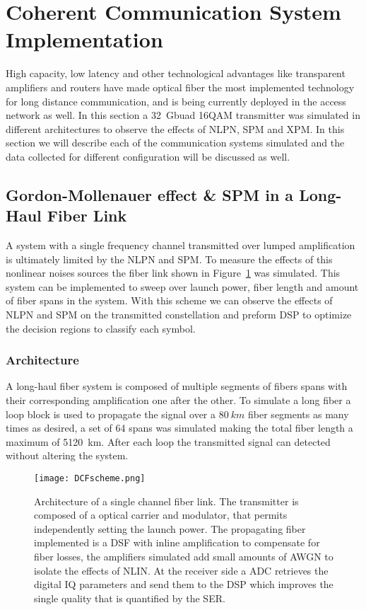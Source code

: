 \section{Coherent Communication System Implementation}

High capacity, low latency and other technological advantages like transparent amplifiers and routers have made optical fiber the most implemented technology for long distance communication, and is being currently deployed in the access network as well. In this section a 32~Gbuad 16QAM transmitter was simulated in different architectures to observe the effects of NLPN, SPM and XPM. In this section we will describe each of the communication systems simulated and the data collected for different configuration will be discussed as well. 


\subsection{Gordon-Mollenauer effect \& SPM in a Long-Haul Fiber Link }
A system with a single frequency channel transmitted over lumped amplification is ultimately limited by the NLPN and SPM. To measure the effects of this nonlinear noises sources the fiber link shown in Figure~\ref{fig:1chlink} was simulated. This system can be implemented to sweep over launch power, fiber length and amount of fiber spans in the system. With this scheme we can observe the effects of NLPN and SPM on the transmitted constellation and preform DSP to optimize the decision regions to classify each symbol.


\subsubsection{Architecture}
A long-haul fiber system is composed of multiple segments of fibers spans with their corresponding amplification one after the other. To simulate a long fiber a loop block is used to propagate the signal over a  $80~km$ fiber segments as many times as desired, a set of 64 spans was simulated making the total fiber length a maximum of 5120~km. After each loop the transmitted signal can detected without altering the system. 
 

\begin{figure}[h]
\centering
\texttt{[image: DCFscheme.png]}
\caption{Architecture of a single channel fiber link. The transmitter is composed of a optical carrier and modulator, that permits independently setting the launch power. The propagating fiber implemented is a DSF with inline amplification to compensate for fiber losses, the amplifiers simulated add small amounts of AWGN to isolate the effects of NLIN. At the receiver side a ADC retrieves the digital IQ parameters and send them to the DSP which improves the single quality that is quantified by the SER. }
\label{fig:1chlink}
\end{figure}
  
